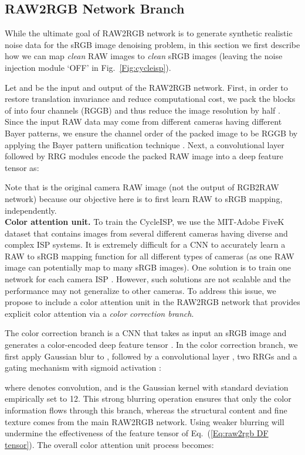 \documentclass[10pt,twocolumn,letterpaper]{article}
\begin{document}
\subsection{RAW2RGB Network Branch}
While the ultimate goal of RAW2RGB network is to  generate synthetic realistic noise data for the sRGB image denoising problem, in this section we first describe how we can map \emph{clean} RAW images to \emph{clean} sRGB images (leaving the noise injection module `OFF' in Fig.~\ref{Fig:cycleisp}).

Let  
and  be
the input and output of the RAW2RGB network.
First, in order to restore translation invariance and reduce computational cost, we pack the  blocks of  into four channels (RGGB) and thus reduce the image resolution by half \cite{Brooks2019,Chen2018,Gharbi2016}. 
Since the input RAW data may come from different cameras having different Bayer patterns, we ensure the channel order of the packed image to be RGGB by applying the Bayer pattern unification technique \cite{liu2019learning}. 
Next, a convolutional layer  followed by  RRG modules encode the packed RAW image  into a deep feature tensor  as:

Note that  is the original camera RAW image (not the output of RGB2RAW network) because our objective here is to first learn RAW to sRGB mapping, independently. 
\vspace{0.4em}\\
\noindent \textbf{Color attention unit.}
To train the CycleISP, we use the MIT-Adobe FiveK dataset \cite{mit_fivek} that contains images from several different cameras having diverse and complex ISP systems. 
It is extremely difficult for a CNN to accurately learn a RAW to sRGB mapping function for all different types of cameras (as one RAW image can potentially map to many sRGB images). 
One solution is to train one network for each camera ISP \cite{Chen2018,Schwartz2018,zamir2019ISP}. 
However, such solutions are not  
scalable and the performance may not generalize to other cameras. 
To address this issue, we propose to include a color attention unit in the RAW2RGB network that provides explicit color attention via a \emph{color correction branch}. 


The color correction branch is a CNN that takes as input an sRGB image  and generates a color-encoded deep feature tensor . 
In the color correction branch, we first apply Gaussian blur to , followed by a convolutional layer , two RRGs and a gating mechanism with sigmoid activation :

where  denotes convolution, and  is the Gaussian kernel with standard deviation empirically set to 12. 
This strong blurring operation ensures that only the color information flows through this branch, whereas the structural content and fine texture comes from the main RAW2RGB network. 
Using weaker blurring will undermine the effectiveness of the feature tensor  of Eq.~(\ref{Eq:raw2rgb DF tensor}). 
The overall color attention unit process becomes:
\end{document}
